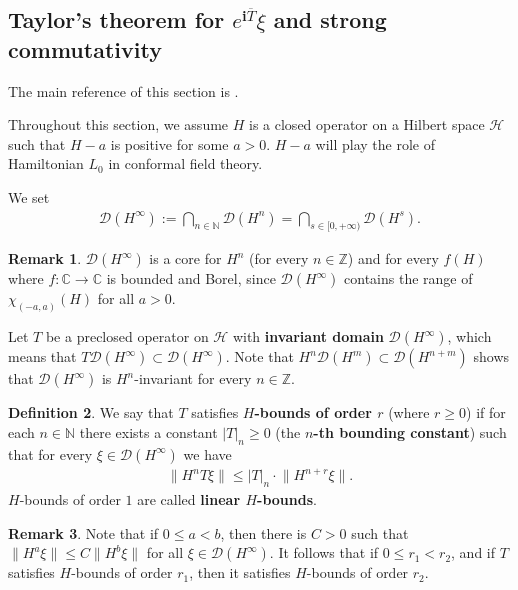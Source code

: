 \documentclass[12pt,a4paper,notitlepage]{article}
\theoremstyle{definition}
\newtheorem{df}{Definition}[subsection]
\newtheorem{rem}[df]{Remark}
\theoremstyle{plain}
\newcommand{\mc}{\mathcal}
\newcommand{\ovl}{\overline}
\newcommand{\Dom}{\scr D}
\newcommand{\scr}{\mathscr}
\newcommand{\im}{\mathbf{i}}
\newcommand{\Cbb}{\mathbb C}
\newcommand{\Nbb}{\mathbb N}
\newcommand{\Zbb}{\mathbb Z}
\numberwithin{equation}{subsection}
\begin{document}
\subsection{Taylor's theorem for $e^{\im\ovl T}\xi$ and strong commutativity}

The main reference of this section is \cite{TL99}.

Throughout this section, we assume $H$ is a closed operator on a Hilbert space $\mc H$ such that $H-a$ is positive for some $a>0$. $H-a$ will play the role of Hamiltonian $L_0$ in conformal field theory.





We set \index{DH@$\Dom(H^\infty)$}
\begin{gather*}
	\Dom(H^\infty):=\bigcap_{n\in\Nbb}\Dom(H^n)=\bigcap_{s\in [0,+\infty)}\Dom(H^s). 
\end{gather*}

\begin{rem}\label{lb8}
$\Dom(H^\infty)$ is a core for $H^n$ (for every $n\in\Zbb$) and for every $f(H)$ where $f:\Cbb\rightarrow\Cbb$ is bounded and Borel, since $\Dom(H^\infty)$ contains the range of $\chi_{(-a,a)}(H)$ for all $a>0$. 
\end{rem}



Let $T$ be a preclosed operator on $\mc H$ with \textbf{invariant domain} $\Dom(H^\infty)$, which means that $T\Dom(H^\infty)\subset\Dom(H^\infty)$. Note that $H^n\Dom(H^m)\subset\Dom(H^{n+m})$ shows that $\Dom(H^\infty)$ is $H^n$-invariant for every $n\in\Zbb$. 

\begin{df}
We say that $T$ satisfies \textbf{$H$-bounds of order $r$} (where $r\geq 0$) if for each $n\in\Nbb$ there exists a constant $|T|_n\geq0$ (the \textbf{$n$-th bounding constant}) such that for every $\xi\in\Dom(H^\infty)$ we have
\begin{align}
\lVert H^nT\xi\lVert\leq |T|_n\cdot \lVert H^{n+r}\xi\lVert.\label{eq7}	
\end{align}
$H$-bounds of order $1$ are called \textbf{linear $H$-bounds}.
\end{df}


\begin{rem}
Note that if $0\leq a<b$, then there is $C> 0$ such that $\lVert H^a\xi\lVert\leq C\lVert H^b\xi\lVert$ for all $\xi\in\Dom(H^\infty)$. It follows that if $0\leq r_1<r_2$, and if $T$ satisfies $H$-bounds of order $r_1$, then it satisfies $H$-bounds of order $r_2$.
\end{rem}
\end{document}
